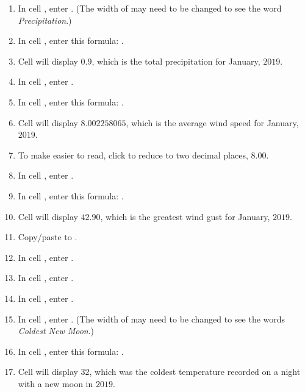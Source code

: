 \begin{enumbox}
\begin{enumerate}
		\item In cell , enter .  (The width of  may need to be changed to see the word \textit{Precipitation}.)
		\item In cell , enter this formula: .
		\item Cell  will display $ 0.9 $, which is the total precipitation for January, $ 2019 $.
	
		\item In cell , enter .
		\item In cell , enter this formula: .
		\item Cell  will display $ 8.002258065 $, which is the average wind speed for January, $ 2019 $.
		\item To make  easier to read, click  to reduce  to two decimal places, $ 8.00 $.
	
		\item In cell , enter .
		\item In cell , enter this formula: .
		\item Cell  will display $ 42.90 $, which is the greatest wind gust for January, $ 2019 $.
	
		\item Copy/paste  to .
		\item In cell , enter .
		\item In cell , enter .
		\item In cell , enter .
		\item In cell , enter . (The width of  may need to be changed to see the words \textit{Coldest New Moon}.)
		\item In cell , enter this formula: .
		\item Cell  will display $ 32 $, which was the coldest temperature recorded on a night with a new moon in $ 2019 $.
	

\end{enumerate}
\end{enumbox}

